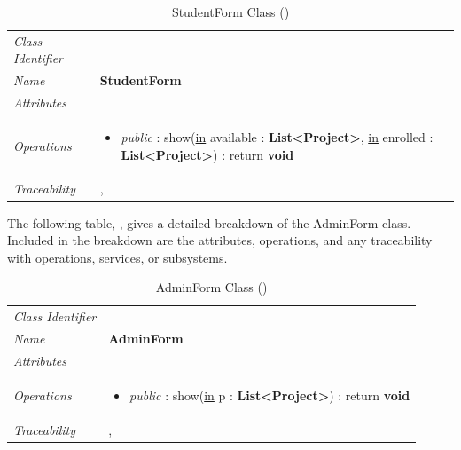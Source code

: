 \documentclass[12pt,letterpaper]{article}
\begin{document}
\begin{table}[H]
    \caption{StudentForm Class ()} 
	\begin{tabu} to 
		\toprule
		Class Identifier &  \\
		Name & {\bf StudentForm} \\
		Attributes & \\

		Operations &
		\begin{minipage}[t]{\linewidth}
			\begin{itemize}
			    \item {\it public} : show(\underline{in} available : {\bf List<Project>}, \underline{in} enrolled : {\bf List<Project>}) : return {\bf void}
	        \end{itemize}
	    \end{minipage} \\
	    	Traceability & ,  \\
		\toprule
	\end{tabu}
\end{table}

The following table, , gives a detailed breakdown of the AdminForm class. Included in the breakdown are the attributes, operations, and any traceability with operations, services, or subsystems.

\begin{table}[H]
    \caption{AdminForm Class ()} 
	\begin{tabu} to 
		\toprule
		Class Identifier &  \\
		Name & {\bf AdminForm} \\
		Attributes & \\

		Operations &
		\begin{minipage}[t]{\linewidth}
			\begin{itemize}
			    \item {\it public} : show(\underline{in} p : {\bf List<Project>}) : return {\bf void}
	        \end{itemize}
	    \end{minipage} \\
	    	Traceability & , \\
		\toprule
	\end{tabu}
\end{table}
\end{document}

